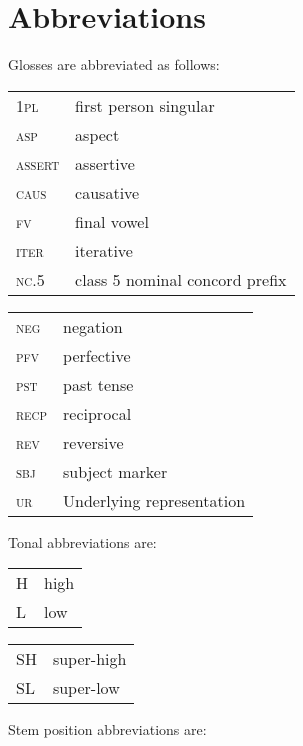 \documentclass[output=paper,newtxmath,modfonts,nonflat,hidelinks]{langsci/langscibook}
\begin{document}
\section*{Abbreviations}
 
 
 
 
 
Glosses are abbreviated as follows:\\
\medskip

\begin{tabularx}{.45\textwidth}{lQ} 
\textsc{1pl}    &    {first person} singular\\
\textsc{asp}    &    {aspect}\\
\textsc{assert}  &    assertive\\
\textsc{caus}  &    causative\\
\textsc{fv}    &    {final vowel}\\
\textsc{iter}    &  iterative\\
\textsc{nc}.5   &   class 5 nominal concord prefix\\ 
\end{tabularx}
\begin{tabularx}{.45\textwidth}{lQ}
\textsc{neg}    &   {negation}\\
\textsc{pfv}    &   {perfective}\\
\textsc{pst}    &   {past tense}\\
\textsc{recp}  &   reciprocal\\
\textsc{rev}  &   reversive\\
\textsc{sbj}  &  {subject marker} \\
\textsc{ur}  &   {Underlying representation}  
\end{tabularx}
\medskip

 
\noindent Tonal abbreviations are:\\
\medskip


\begin{tabularx}{.45\textwidth}{lQ}
H     &  high\\
L     &  low\\
\end{tabularx}
\begin{tabularx}{.45\textwidth}{lQ}
SH  &  super-high\\
SL   &  super-low
\end{tabularx}
\medskip


\noindent Stem position abbreviations are:\\
\medskip
\end{document}

